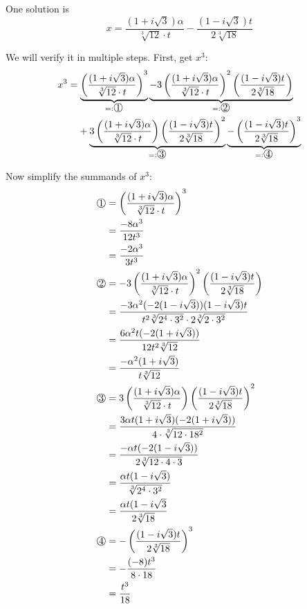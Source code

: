 One solution is
\[x = \frac{(1+i \sqrt{3})\alpha}{\sqrt[3]{12} \cdot t}
     -\frac{(1-i\sqrt{3}) t}{2\sqrt[3]{18}}\]

We will verify it in multiple steps. First, get $x^3$:
\begin{align}
    x^3 &= \underbrace{\left (\frac{(1+i\sqrt{3})\alpha}{\sqrt[3]{12} \cdot t} \right)^3}_{=: \raisebox{.5pt}{\textcircled{\raisebox{-.9pt} {1}}}}
           \underbrace{- 3 \left(\frac{(1+i\sqrt{3})\alpha}{\sqrt[3]{12} \cdot t} \right)^2 \left(\frac{(1-i\sqrt{3})t}{2 \sqrt[3]{18}} \right)}_{=: \raisebox{.5pt}{\textcircled{\raisebox{-.9pt} {2}}}}\\
         &\hphantom{{}=}+ \underbrace{3 \left(\frac{(1+i\sqrt{3})\alpha}{\sqrt[3]{12} \cdot t} \right) \left(\frac{(1-i\sqrt{3})t}{2 \sqrt[3]{18}}\right)^2}_{=: \raisebox{.5pt}{\textcircled{\raisebox{-.9pt} {3}}}}
           \underbrace{- \left(\frac{(1-i\sqrt{3})t}{2 \sqrt[3]{18}}\right)^3}_{=: \raisebox{.5pt}{\textcircled{\raisebox{-.9pt} {4}}}}
\end{align}

Now simplify the summands of $x^3$:
\begin{align}
    \raisebox{.5pt}{\textcircled{\raisebox{-.9pt} {1}}} &=
    \left (\frac{(1+i\sqrt{3})\alpha}{\sqrt[3]{12} \cdot t} \right)^3\\
    &= \frac{-8\alpha^3}{12 t^3}\\
    &= \frac{-2 \alpha^3}{3 t^3}\\
    \raisebox{.5pt}{\textcircled{\raisebox{-.9pt} {2}}} &=- 3 \left(\frac{(1+i\sqrt{3})\alpha}{\sqrt[3]{12} \cdot t} \right)^2 \left(\frac{(1-i\sqrt{3})t}{2 \sqrt[3]{18}} \right)\\
    &= \frac{-3\alpha^2(-2(1-i\sqrt{3}))(1-i\sqrt{3})t}{t^2 \sqrt[3]{2^4 \cdot 3^2} \cdot 2 \sqrt[3]{2 \cdot 3^2}}\\
    &= \frac{6\alpha^2 t (-2 (1+i \sqrt{3}))}{12 t^2 \sqrt[3]{12}}\\
    &= \frac{- \alpha^2 (1+i\sqrt{3})}{t\sqrt[3]{12}}\\
    \raisebox{.5pt}{\textcircled{\raisebox{-.9pt} {3}}} &= 3 \left(\frac{(1+i\sqrt{3})\alpha}{\sqrt[3]{12} \cdot t} \right) \left(\frac{(1-i\sqrt{3})t}{2 \sqrt[3]{18}}\right)^2\\
    &= \frac{3\alpha t (1+i\sqrt{3})(-2(1+i\sqrt{3}))}{4 \cdot \sqrt[3]{12 \cdot 18^2}}\\
    &= \frac{-\alpha t (-2 (1 - i \sqrt{3}))}{2 \sqrt[3]{12 \cdot 4 \cdot 3}}\\
    &= \frac{\alpha t (1-i\sqrt{3})}{\sqrt[3]{2^4 \cdot 3^2}}\\
    &= \frac{\alpha t (1-i\sqrt{3}}{2 \sqrt[3]{18}}\\
    \raisebox{.5pt}{\textcircled{\raisebox{-.9pt} {4}}} &= - \left(\frac{(1-i\sqrt{3})t}{2 \sqrt[3]{18}}\right)^3\\
    &=- \frac{(-8) t^3}{8 \cdot 18}\\
    &= \frac{t^3}{18}
\end{align}

